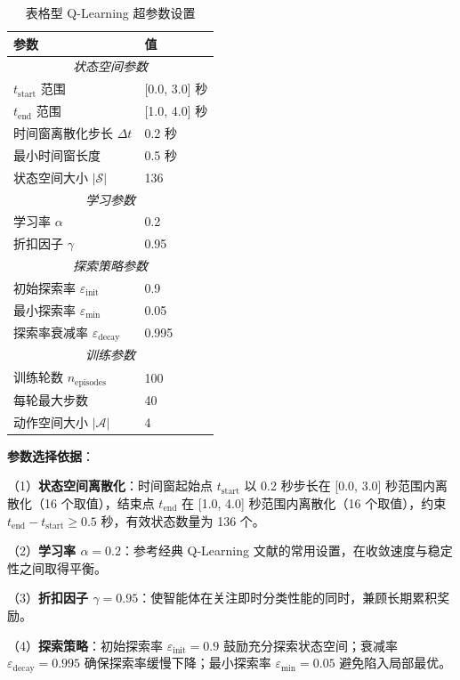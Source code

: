 \begin{table}[H]
\centering
\caption{表格型 Q-Learning 超参数设置}
\label{tab:tabular_ql_params}
\begin{tabular}{ll}
\hline
\textbf{参数} & \textbf{值} \\
\hline
\multicolumn{2}{c}{\textit{状态空间参数}} \\
\hline
$t_{\text{start}}$ 范围 & [0.0, 3.0] 秒 \\
$t_{\text{end}}$ 范围 & [1.0, 4.0] 秒 \\
时间窗离散化步长 $\Delta t$ & 0.2 秒 \\
最小时间窗长度 & 0.5 秒 \\
状态空间大小 $|\mathcal{S}|$ & 136 \\
\hline
\multicolumn{2}{c}{\textit{学习参数}} \\
\hline
学习率 $\alpha$ & 0.2 \\
折扣因子 $\gamma$ & 0.95 \\
\hline
\multicolumn{2}{c}{\textit{探索策略参数}} \\
\hline
初始探索率 $\varepsilon_{\text{init}}$ & 0.9 \\
最小探索率 $\varepsilon_{\text{min}}$ & 0.05 \\
探索率衰减率 $\varepsilon_{\text{decay}}$ & 0.995 \\
\hline
\multicolumn{2}{c}{\textit{训练参数}} \\
\hline
训练轮数 $n_{\text{episodes}}$ & 100 \\
每轮最大步数 & 40 \\
动作空间大小 $|\mathcal{A}|$ & 4 \\
\hline
\end{tabular}
\end{table}

\noindent\textbf{参数选择依据}：

（1）\textbf{状态空间离散化}：时间窗起始点 $t_{\text{start}}$ 以 0.2 秒步长在 [0.0, 3.0] 秒范围内离散化（16 个取值），结束点 $t_{\text{end}}$ 在 [1.0, 4.0] 秒范围内离散化（16 个取值），约束 $t_{\text{end}} - t_{\text{start}} \geq 0.5$ 秒，有效状态数量为 136 个。

（2）\textbf{学习率 $\alpha = 0.2$}：参考经典 Q-Learning 文献的常用设置，在收敛速度与稳定性之间取得平衡。

（3）\textbf{折扣因子 $\gamma = 0.95$}：使智能体在关注即时分类性能的同时，兼顾长期累积奖励。

（4）\textbf{探索策略}：初始探索率 $\varepsilon_{\text{init}} = 0.9$ 鼓励充分探索状态空间；衰减率 $\varepsilon_{\text{decay}} = 0.995$ 确保探索率缓慢下降；最小探索率 $\varepsilon_{\text{min}} = 0.05$ 避免陷入局部最优。

